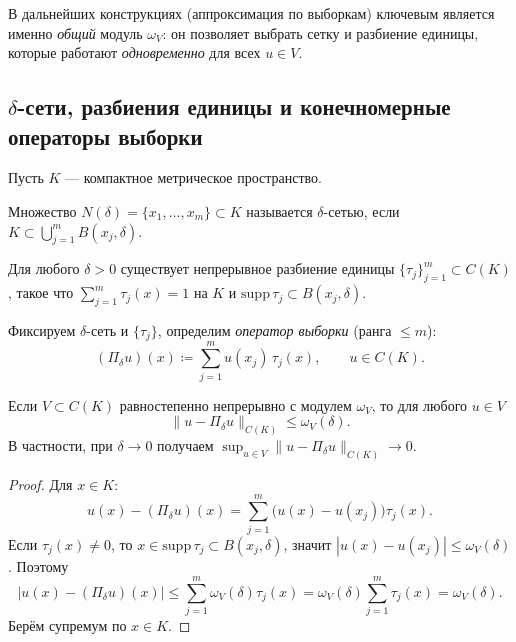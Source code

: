 \documentclass[../NDCNNAI_main.tex]{subfiles}
\begin{document}
\begin{remark}
В дальнейших конструкциях (аппроксимация по выборкам) ключевым является именно \emph{общий} модуль \(\omega_V\):
он позволяет выбрать сетку и разбиение единицы, которые работают \emph{одновременно} для всех \(u\in V\).
\end{remark}

\subsection*{\(\delta\)-сети, разбиения единицы и конечномерные операторы выборки}

Пусть \(K\) --- компактное метрическое пространство.

\begin{definition}
Множество \(N(\delta)=\{x_1,\dots,x_m\}\subset K\) называется \(\delta\)-сетью, если
\(K\subset \bigcup_{j=1}^m B(x_j,\delta)\).
\end{definition}

\begin{proposition}\label{prop:pou}
Для любого \(\delta>0\) существует непрерывное разбиение единицы \(\{\tau_j\}_{j=1}^m\subset C(K)\),
такое что \(\sum_{j=1}^m\tau_j(x)=1\) на \(K\) и \(\mathrm{supp}\,\tau_j\subset B(x_j,\delta)\).
\end{proposition}

Фиксируем \(\delta\)-сеть и \(\{\tau_j\}\), определим \emph{оператор выборки} (ранга \(\le m\)):
\begin{equation}\label{eq:sampling}
(\Pi_\delta u)(x)\coloneq\sum_{j=1}^m u(x_j)\,\tau_j(x), \qquad u\in C(K). \tag{\(\star\)}
\end{equation}

\begin{lemma}\label{lem:sampling_error}
Если \(V\subset C(K)\) равностепенно непрерывно с модулем \(\omega_V\), то для любого \(u\in V\)
\[
\|u-\Pi_\delta u\|_{C(K)} \le \omega_V(\delta).
\]
В частности, при \(\delta\to 0\) получаем \(\sup_{u\in V}\|u-\Pi_\delta u\|_{C(K)}\to 0\).
\end{lemma}

\begin{proof}
Для \(x\in K\):
\[
u(x)-(\Pi_\delta u)(x)=\sum_{j=1}^m\bigl(u(x)-u(x_j)\bigr)\tau_j(x).
\]
Если \(\tau_j(x)\neq 0\), то \(x\in \mathrm{supp}\,\tau_j\subset B(x_j,\delta)\), значит \(|u(x)-u(x_j)|\le \omega_V(\delta)\).
Поэтому
\[
|u(x)-(\Pi_\delta u)(x)|
\le \sum_{j=1}^m \omega_V(\delta)\tau_j(x)
=\omega_V(\delta)\sum_{j=1}^m\tau_j(x)
=\omega_V(\delta).
\]
Берём супремум по \(x\in K\).
\end{proof}
\end{document}
